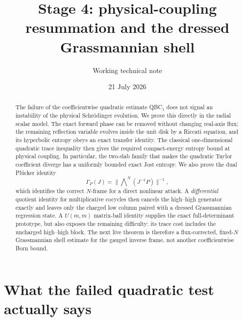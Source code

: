 \documentclass[11pt]{article}
\title{Stage 4: physical-coupling resummation and the dressed Grassmannian shell}
\author{Working technical note}
\date{21 July 2026}
\theoremstyle{definition}
\begin{document}
\maketitle

\begin{abstract}
The failure of the coefficientwise quadratic estimate QBC$_1$ does not signal
an instability of the physical Schr\"odinger evolution.  We prove this
directly in the radial scalar model.  The exact forward phase can be removed
without changing real-axis flux; the remaining reflection variable evolves
inside the unit disk by a Riccati equation, and its hyperbolic entropy obeys an
exact transfer identity.  The classical one-dimensional quadratic trace
inequality then gives the required compact-energy entropy bound at physical
coupling.  In particular, the two-slab family that makes the quadratic Taylor
coefficient diverge has a uniformly bounded exact Jost entropy.  We also prove
the dual Pl\"ucker identity
\[
 \Gamma_P(J)=\|\mathop{\bigwedge}\nolimits^N(J^{-1}P)\|^{-1},
\]
which identifies the correct $N$-frame for a direct nonlinear attack.  A
\emph{differential} quotient identity for multiplicative cocycles then cancels the
high--high generator exactly and leaves only the charged low column paired
with a dressed Grassmannian regression state.  A
$U(m,m)$ matrix-ball identity supplies the exact full-determinant prototype,
but also exposes the remaining difficulty: its trace cost includes the
uncharged high--high block.  The next live theorem is therefore a
flux-corrected, fixed-$N$ Grassmannian shell estimate for the gauged inverse
frame, not another coefficientwise Born bound.
\end{abstract}

\noindent
{}

\section{What the failed quadratic test actually says}
\end{document}
